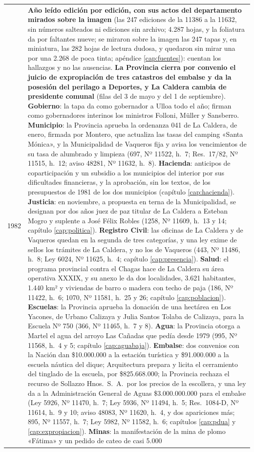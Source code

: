 \begin{longtable}{@{}p{2.7cm}p{10.3cm}@{}}
1982 & \textbf{Año leído edición por edición, con sus actos del departamento mirados sobre la imagen} (las 247 ediciones de la 11386 a la 11632, sin números salteados ni ediciones sin archivo; 4.287 hojas, y la foliatura da por faltantes nueve; se miraron sobre la imagen las 247 tapas y, en miniatura, las 282 hojas de lectura dudosa, y quedaron sin mirar una por una 2.268 de poca tinta; apéndice \ref{cap:fuentes}): cuentan los hallazgos y no las ausencias. \textbf{La Provincia cierra por convenio el juicio de expropiación de tres catastros del embalse y da la posesión del perilago a Deportes, y La Caldera cambia de presidente comunal} (filas del 3 de mayo y del 1 de septiembre). \textbf{Gobierno}: la tapa da como gobernador a Ulloa todo el año; firman como gobernadores interinos los ministros Folloni, Müller y Sansberro. \textbf{Municipio}: la Provincia aprueba la ordenanza 041 de La Caldera, de enero, firmada por Montero, que actualiza las tasas del camping «Santa Mónica», y la Municipalidad de Vaqueros fija y avisa los vencimientos de su tasa de alumbrado y limpieza (697, Nº 11522, h.\ 7; Res.\ 17/82, Nº 11515, h.\ 12; aviso 48281, Nº 11632, h.\ 8). \textbf{Hacienda}: anticipos de coparticipación y un subsidio a los municipios del interior por sus dificultades financieras, y la aprobación, sin los textos, de los presupuestos de 1981 de los dos municipios (capítulo \ref{cap:hacienda}). \textbf{Justicia}: en noviembre, a propuesta en terna de la Municipalidad, se designan por dos años juez de paz titular de La Caldera a Esteban Mogro y suplente a José Félix Robles (1258, Nº 11609, h.\ 13 y 14; capítulo \ref{cap:politica}). \textbf{Registro Civil}: las oficinas de La Caldera y de Vaqueros quedan en la segunda de tres categorías, y una ley exime de sellos los trámites de La Caldera, y no los de Vaqueros (443, Nº 11486, h.\ 8; Ley 6024, Nº 11625, h.\ 4; capítulo \ref{cap:presencia}). \textbf{Salud}: el programa provincial contra el Chagas hace de La Caldera su área operativa XXXIX, y su anexo le da dos localidades, 3.621 habitantes, 1.440 km² y viviendas de barro o madera con techo de paja (186, Nº 11422, h.\ 6; 1070, Nº 11581, h.\ 25 y 26; capítulo \ref{cap:poblacion}). \textbf{Escuelas}: la Provincia aprueba la donación de una hectárea en Los Yacones, de Urbano Calizaya y Julia Santos Tolaba de Calizaya, para la Escuela Nº 750 (366, Nº 11465, h.\ 7 y 8). \textbf{Agua}: la Provincia otorga a Martel el agua del arroyo Las Cañadas que pedía desde 1979 (995, Nº 11568, h.\ 4 y 5; capítulo \ref{cap:aguabaja}). \textbf{Embalse}: dos convenios con la Nación dan \$10.000.000 a la estación turística y \$91.000.000 a la escuela náutica del dique; Arquitectura prepara y licita el cerramiento del tinglado de la escuela, por \$825.668.000; la Provincia rechaza el recurso de Sollazzo Hnos.\ S.\ A.\ por los precios de la escollera, y una ley da a la Administración General de Aguas \$3.000.000.000 para el embalse (Ley 5926, Nº 11470, h.\ 7; Ley 5936, Nº 11494, h.\ 5; Res.\ 1084-D, Nº 11614, h.\ 9 y 10; aviso 48083, Nº 11620, h.\ 4, y dos apariciones más; 895, Nº 11557, h.\ 7; Ley 5982, Nº 11582, h.\ 6; capítulos \ref{cap:pdua} y \ref{cap:expropiacion}). \textbf{Minas}: la manifestación de la mina de plomo «Fátima» y un pedido de cateo de casi 5.000 
\end{longtable}
